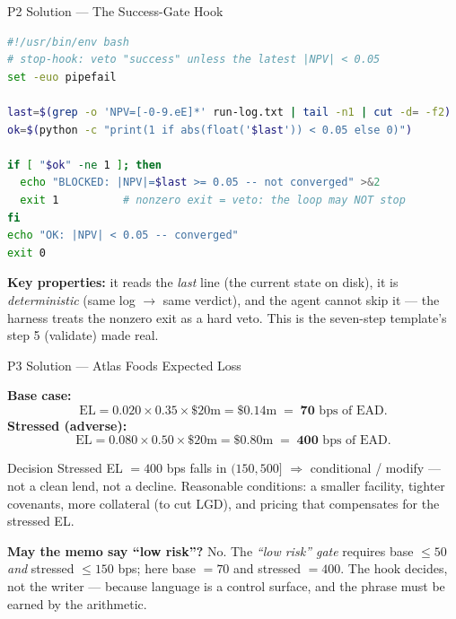 \documentclass[9pt,t]{beamer}
\begin{document}
\begin{frame}[fragile]{P2 Solution --- The Success-Gate Hook}

\begin{lstlisting}[language=bash]
#!/usr/bin/env bash
# stop-hook: veto "success" unless the latest |NPV| < 0.05
set -euo pipefail

last=$(grep -o 'NPV=[-0-9.eE]*' run-log.txt | tail -n1 | cut -d= -f2)
ok=$(python -c "print(1 if abs(float('$last')) < 0.05 else 0)")

if [ "$ok" -ne 1 ]; then
  echo "BLOCKED: |NPV|=$last >= 0.05 -- not converged" >&2
  exit 1          # nonzero exit = veto: the loop may NOT stop
fi
echo "OK: |NPV| < 0.05 -- converged"
exit 0
\end{lstlisting}

\smallskip
\textbf{Key properties:} it reads the \emph{last} line (the current state on
disk), it is \emph{deterministic} (same log $\to$ same verdict), and the agent
cannot skip it --- the harness treats the nonzero exit as a hard veto. This is the
seven-step template's step 5 (validate) made real.
\end{frame}

\begin{frame}{P3 Solution --- Atlas Foods Expected Loss}

\textbf{Base case:}
\[
  \mathrm{EL} = 0.020 \times 0.35 \times \$20\text{m} = \$0.14\text{m}
  \;=\; \mathbf{70}\text{ bps of EAD}.
\]
\textbf{Stressed (adverse):}
\[
  \mathrm{EL} = 0.080 \times 0.50 \times \$20\text{m} = \$0.80\text{m}
  \;=\; \mathbf{400}\text{ bps of EAD}.
\]

\medskip
\begin{block}{Decision}
Stressed EL $=400$ bps falls in $(150, 500]$ $\Rightarrow$
\alert{conditional / modify} --- not a clean lend, not a decline. Reasonable
conditions: a smaller facility, tighter covenants, more collateral (to cut LGD),
and pricing that compensates for the stressed EL.
\end{block}

\medskip
\textbf{May the memo say ``low risk''?} No. The \emph{``low risk'' gate} requires
base $\leq 50$ \emph{and} stressed $\leq 150$ bps; here base $=70$ and stressed
$=400$. \alert{The hook decides, not the writer} --- because language is a control
surface, and the phrase must be earned by the arithmetic.
\end{frame}
\end{document}
